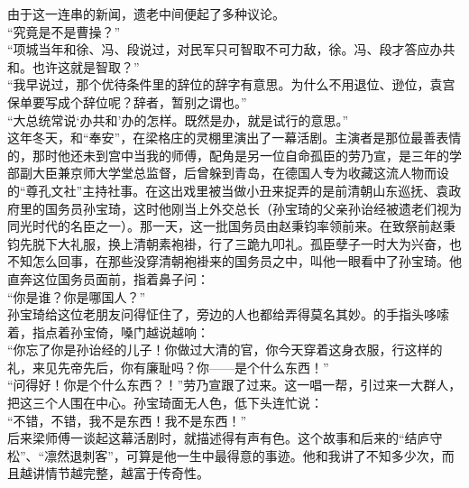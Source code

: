 由于这一连串的新闻，遗老中间便起了多种议论。\\

“究竟是不是曹操？”\\

“项城当年和徐、冯、段说过，对民军只可智取不可力敌，徐。冯、段才答应办共和。也许这就是智取？”\\

“我早说过，那个优待条件里的辞位的辞字有意思。为什么不用退位、逊位，袁宫保单要写成个辞位呢？辞者，暂别之谓也。”\\

“大总统常说‘办共和’办的怎样。既然是办，就是试行的意思。”\\

这年冬天，和“奉安”，在梁格庄的灵棚里演出了一幕活剧。主演者是那位最善表情的，那时他还未到宫中当我的师傅，配角是另一位自命孤臣的劳乃宣，是三年的学部副大臣兼京师大学堂总监督，后曾躲到青岛，在德国人专为收藏这流人物而设的“尊孔文社”主持社事。在这出戏里被当做小丑来捉弄的是前清朝山东巡抚、袁政府里的国务员孙宝琦，这时他刚当上外交总长（孙宝琦的父亲孙诒经被遗老们视为同光时代的名臣之一）。那一天，这一批国务员由赵秉钧率领前来。在致祭前赵秉钧先脱下大礼服，换上清朝素袍褂，行了三跪九叩礼。孤臣孽子一时大为兴奋，也不知怎么回事，在那些没穿清朝袍褂来的国务员之中，叫他一眼看中了孙宝琦。他直奔这位国务员面前，指着鼻子问：\\

“你是谁？你是哪国人？”\\

孙宝琦给这位老朋友问得怔住了，旁边的人也都给弄得莫名其妙。的手指头哆嗦着，指点着孙宝倚，嗓门越说越响：\\

“你忘了你是孙诒经的儿子！你做过大清的官，你今天穿着这身衣服，行这样的礼，来见先帝先后，你有廉耻吗？你——是个什么东西！”\\

“问得好！你是个什么东西？！”劳乃宣跟了过来。这一唱一帮，引过来一大群人，把这三个人围在中心。孙宝琦面无人色，低下头连忙说：\\

“不错，不错，我不是东西！我不是东西！”\\

后来梁师傅一谈起这幕活剧时，就描述得有声有色。这个故事和后来的“结庐守松”、“凛然退刺客”，可算是他一生中最得意的事迹。他和我讲了不知多少次，而且越讲情节越完整，越富于传奇性。\\

